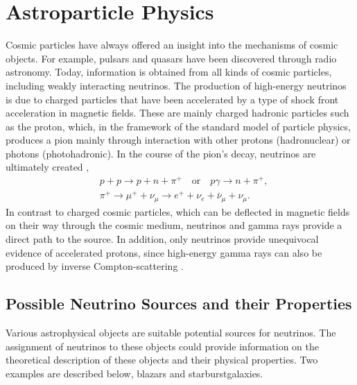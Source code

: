 \chapter{Astroparticle Physics} \label{sec:astro}

Cosmic particles have always offered an insight into the mechanisms of cosmic objects.
For example, pulsars and quasars have been discovered through radio astronomy.
Today, information is obtained from all kinds of cosmic particles, including weakly interacting neutrinos.
The production of high-energy neutrinos is due to charged particles that have been accelerated by a type of shock front acceleration in magnetic fields.
These are mainly charged hadronic particles such as the proton, which, in the framework of the standard model of particle physics, produces a pion mainly through interaction with other protons (hadronuclear) or photons (photohadronic).
In the course of the pion's decay, neutrinos are ultimately created \cite{pdg},
\begin{align}
  &p+p \rightarrow p+n+\pi^+ \quad \text{or} \quad p\gamma \rightarrow n+\pi^+,\\
  &\pi^+ \rightarrow \mu^++\nu_\mu \rightarrow e^++\nu_e+\bar{\nu}_\mu+\nu_\mu.
\end{align}
In contrast to charged cosmic particles, which can be deflected in magnetic fields on their way through the cosmic medium, neutrinos and gamma rays provide a direct path to the source.
In addition, only neutrinos provide unequivocal evidence of accelerated protons, since high-energy gamma rays can also be produced by inverse Compton-scattering \cite{spiering}.


\section{Possible Neutrino Sources and their Properties}

Various astrophysical objects are suitable potential sources for neutrinos.
The assignment of neutrinos to these objects could provide information on the theoretical description of these objects and their physical properties.
Two examples are described below, blazars and starburstgalaxies.

